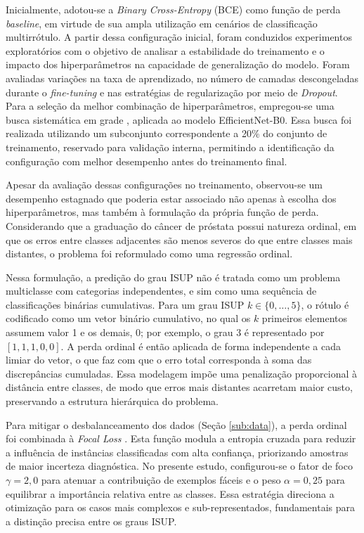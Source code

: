Inicialmente, adotou-se a \textit{Binary Cross-Entropy} (BCE) como função de perda \textit{baseline}, em virtude de sua ampla utilização em cenários de classificação multirrótulo. A partir dessa configuração inicial, foram conduzidos experimentos exploratórios com o objetivo de analisar a estabilidade do treinamento e o impacto dos hiperparâmetros na capacidade de generalização do modelo. Foram avaliadas variações na taxa de aprendizado, no número de camadas descongeladas durante o \textit{fine-tuning} e nas estratégias de regularização por meio de \textit{Dropout}. Para a seleção da melhor combinação de hiperparâmetros, empregou-se uma busca sistemática em grade , aplicada ao modelo EfficientNet-B0. Essa busca foi realizada utilizando um subconjunto correspondente a 20\% do conjunto de treinamento, reservado para validação interna, permitindo a identificação da configuração com melhor desempenho antes do treinamento final.

Apesar da avaliação dessas configurações no treinamento, observou-se um desempenho estagnado que poderia estar associado não apenas à escolha dos hiperparâmetros, mas também à formulação da própria função de perda. Considerando que a graduação do câncer de próstata possui natureza ordinal, em que os erros entre classes adjacentes são menos severos do que entre classes mais distantes, o problema foi reformulado como uma regressão ordinal.

Nessa formulação, a predição do grau ISUP não é tratada como um problema multiclasse com categorias independentes, e sim como uma sequência de classificações binárias cumulativas. Para um grau ISUP $k \in \{0,\dots,5\}$, o rótulo é codificado como um vetor binário cumulativo, no qual os $k$ primeiros elementos assumem valor 1 e os demais, 0; por exemplo, o grau 3 é representado por $[1,1,1,0,0]$. A perda ordinal é então aplicada de forma independente a cada limiar do vetor, o que faz com que o erro total corresponda à soma das discrepâncias cumuladas. Essa modelagem impõe uma penalização proporcional à distância entre classes, de modo que erros mais distantes acarretam maior custo, preservando a estrutura hierárquica do problema.

Para mitigar o desbalanceamento dos dados (Seção \ref{sub:data}), a perda ordinal foi combinada à \textit{Focal Loss} \cite{lin2017focal, DINA2023100699, CHEN2026235}. Esta função modula a entropia cruzada para reduzir a influência de instâncias classificadas com alta confiança, priorizando amostras de maior incerteza diagnóstica. No presente estudo, configurou-se o fator de foco $\gamma = 2,0$ para atenuar a contribuição de exemplos fáceis e o peso $\alpha = 0,25$ para equilibrar a importância relativa entre as classes. Essa estratégia direciona a otimização para os casos mais complexos e sub-representados, fundamentais para a distinção precisa entre os graus ISUP.

